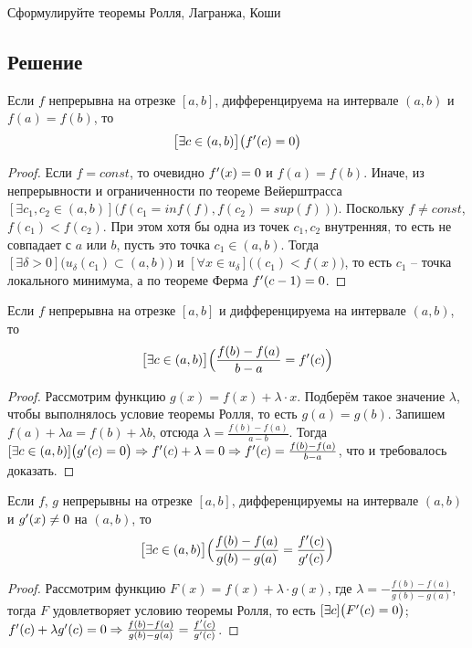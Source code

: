 Сформулируйте теоремы Ролля, Лагранжа, Коши

\subsection*{Решение}
\begin{ther}
    Если $f$ непрерывна на отрезке $[a,b]$, дифференцируема на интервале
    $(a,b)$ и $f(a)=f(b)$, то
    $$\big[\exists c \in (a,b)\big]\big(f^{\prime}(c) = 0\big)$$
\end{ther}
\begin{proof}
    Если $f=const$, то очевидно $f^{\prime}(x)=0$ и $f(a)=f(b)$. Иначе, из
    непрерывности и ограниченности по теореме Вейерштрасса $[\exists c_1,
    c_2\in(a,b)]\big(f(c_1 = inf(f), f(c_2)=sup(f))\big)$. Поскольку $f\neq
    const$, $f(c_1)<f(c_2)$. При этом хотя бы одна из точек $c_1, c_2$
    внутренняя, то есть не совпадает с $a$ или $b$, пусть это точка
    $c_1\in(a,b)$. Тогда $[\exists
    \delta>0]\big(u_{\delta}(c_1)\subset(a,b)\big)$ и $[\forall x \in u_{\delta}
    ]\big((c_1) < f(x)\big)$, то есть $c_1$ -- точка локального минимума, а
    по теореме Ферма $f^{\prime}(c-1) = 0$.
\end{proof}


\begin{ther}
    Если $f$ непрерывна на отрезке $[a,b]$ и дифференцируема на интервале
    $(a,b)$, то $$\big[\exists c \in (a,b)\big]\Big(
    \frac{f(b)-f(a)}{b-a}=f^{\prime}(c) \Big)$$
\end{ther}
\begin{proof}
    Рассмотрим функцию $g(x) = f(x)+\lambda\cdot x$. Подберём такое
    значение $\lambda$, чтобы выполнялось условие теоремы Ролля, то есть
    $g(a)=g(b)$. Запишем $f(a) + \lambda a = f(b) + \lambda b$, отсюда
    $\lambda = \frac{f(b)-f(a)}{a-b}$. Тогда $[\exists c \in
    (a,b)]\big(g^{\prime}(c) = 0\big)\Rightarrow f^{\prime}(c) + \lambda = 0
    \Rightarrow f^{\prime}(c) = \frac{f(b)-f(a)}{b-a}$, что и требовалось
    доказать.
\end{proof}


\begin{ther}
    Если $f$, $g$ непрерывны на отрезке $[a,b]$, дифференцируемы на интервале
    $(a,b)$ и $g^{\prime}(x)\neq 0$ на $(a,b)$, то $$\big[\exists c \in
    (a,b)\big]\Big(
    \frac{f(b)-f(a)}{g(b)-g(a)}=\frac{f^{\prime}(c)}{g^{\prime}(c)} \Big)$$
\end{ther}
\begin{proof}
    Рассмотрим функцию $F(x) = f(x)+\lambda\cdot g(x)$, где
    $\lambda = -\frac{f(b)-f(a)}{g(b)-g(a)}$, тогда $F$ удовлетворяет
    условию теоремы Ролля, то есть $[\exists c]\big( F^{\prime}(c) = 0\big)$;
    $f^{\prime}(c)+\lambda g^{\prime}(c) = 0 \Rightarrow \frac{f(b)-f(a)}{g(b)-g(a)}
    = \frac{f^{\prime}(c)}{g^{\prime}(c)}$.
\end{proof}
